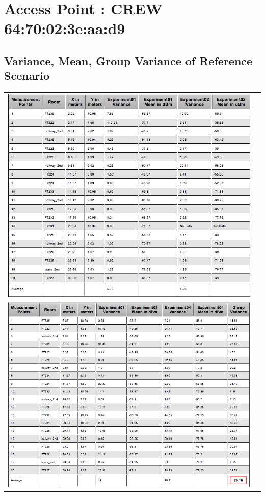 \documentclass[11pt,a4paper,headinclude,footinclude,chapterprefix=on]{scrreprt}
\begin{document}
\pagebreak 
\section{Access Point : CREW 64:70:02:3e:aa:d9} 
\subsection{Variance, Mean, Group Variance of Reference Scenario} 
\begin{longtable}
	{lr} 
	\includegraphics[width=15cm]{../../Source/plot/data/d9_ref1.png} \\
	\includegraphics[width=15cm]{../../Source/plot/data/d9_ref2.png} \\
\end{longtable}
\end{document}
